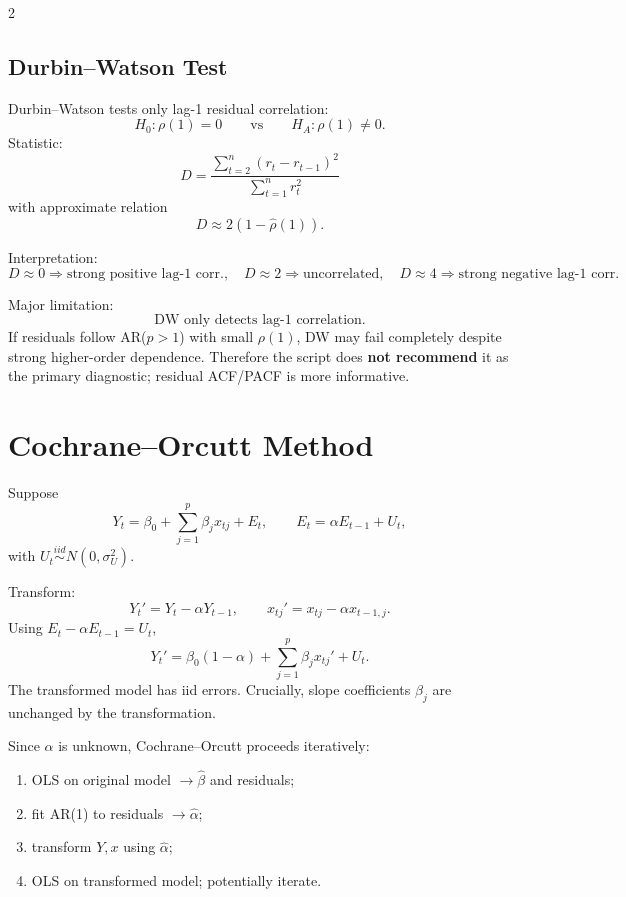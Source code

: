 \documentclass[9pt,a4paper]{extarticle}
\newcommand{\key}[1]{\textbf{#1}}
\begin{document}
\begin{multicols}{2}
\subsection{Durbin--Watson Test}

Durbin--Watson tests only lag-1 residual correlation:
\[
H_0:\rho(1)=0
\qquad\text{vs}\qquad
H_A:\rho(1)\neq0.
\]
Statistic:
\[
\boxed{
D=
\frac{\sum_{t=2}^{n}(r_t-r_{t-1})^2}
{\sum_{t=1}^{n}r_t^2}
}
\]
with approximate relation
\[
\boxed{D\approx2(1-\widehat\rho(1)).}
\]

Interpretation:
\[
D\approx0\Rightarrow\text{strong positive lag-1 corr.},\quad
D\approx2\Rightarrow\text{uncorrelated},\quad
D\approx4\Rightarrow\text{strong negative lag-1 corr.}
\]

Major limitation:
\[
\boxed{\text{DW only detects lag-1 correlation}.}
\]
If residuals follow AR(\(p>1\)) with small \(\rho(1)\), DW may fail completely despite strong higher-order dependence. Therefore the script does \key{not recommend} it as the primary diagnostic; residual ACF/PACF is more informative.

\section{Cochrane--Orcutt Method}

Suppose
\[
Y_t=\beta_0+\sum_{j=1}^{p}\beta_jx_{tj}+E_t,
\qquad
E_t=\alpha E_{t-1}+U_t,
\]
with \(U_t\overset{iid}{\sim}N(0,\sigma_U^2)\).

Transform:
\[
Y_t'=Y_t-\alpha Y_{t-1},
\qquad
x_{tj}'=x_{tj}-\alpha x_{t-1,j}.
\]
Using \(E_t-\alpha E_{t-1}=U_t\),
\[
\boxed{
Y_t'=\beta_0(1-\alpha)+
\sum_{j=1}^{p}\beta_jx_{tj}'+U_t.
}
\]
The transformed model has iid errors. Crucially, slope coefficients \(\beta_j\) are unchanged by the transformation.

Since \(\alpha\) is unknown, Cochrane--Orcutt proceeds iteratively:
\begin{enumerate}
\item OLS on original model \(\to\widehat\beta\) and residuals;
\item fit AR(1) to residuals \(\to\widehat\alpha\);
\item transform \(Y,x\) using \(\widehat\alpha\);
\item OLS on transformed model; potentially iterate.
\end{enumerate}


\end{multicols}
\end{document}
